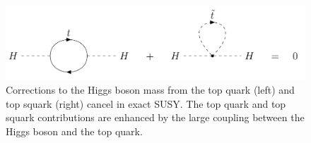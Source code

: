 \begin{figure}
\centering
\includegraphics[width=\textwidth]{figures/intro/higgs_top_stop_corrections.png}
\caption{Corrections to the Higgs boson mass from the top quark (left) and top squark (right) cancel in exact SUSY. The top quark and top squark contributions are enhanced by the large coupling between the Higgs boson and the top quark.}
\label{higgs_top_stop_corrections}
\end{figure}